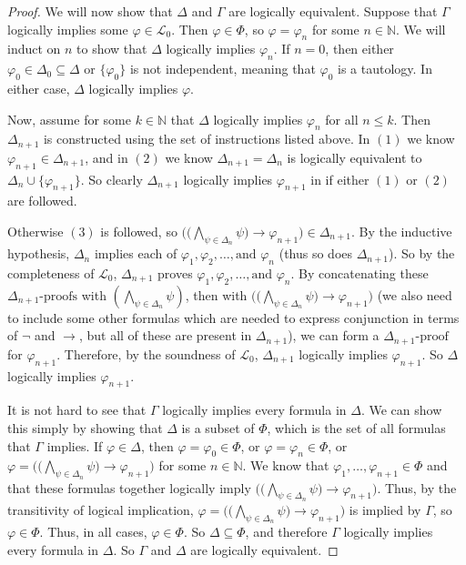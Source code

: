 \documentclass[12pt]{article}
\newcommand{\N}{\mathbb{N}}
\begin{document}
\begin{proof}
We will now show that $\Delta$ and $\Gamma$ are logically equivalent.  Suppose that $\Gamma$ logically implies some $\varphi \in \mathcal{L}_0$.  Then $\varphi \in \Phi$, so $\varphi = \varphi_n$ for some $n \in \N$.  We will induct on $n$ to show that $\Delta$ logically implies $\varphi_n$.  If $n = 0$, then either $\varphi_0 \in \Delta_0 \subseteq \Delta$ or $\{ \varphi_0 \}$ is not independent, meaning that $\varphi_0$ is a tautology.  In either case, $\Delta$ logically implies $\varphi$.

Now, assume for some $k \in \N$ that $\Delta$ logically implies $\varphi_n$ for all $n \leq k$.  Then $\Delta_{n+1}$ is constructed using the set of instructions listed above.  In $(1)$ we know $\varphi_{n+1} \in \Delta_{n+1}$, and in $(2)$ we know $\Delta_{n+1} = \Delta_n$ is logically equivalent to $\Delta_n \cup \{ \varphi_{n+1} \}$.  So clearly $\Delta_{n+1}$ logically implies $\varphi_{n+1}$ in if either $(1)$ or $(2)$ are followed.

Otherwise $(3)$ is followed, so $\big( \big( \bigwedge_{\psi \in \Delta_n} \psi \big) \to \varphi_{n+1} \big) \in \Delta_{n+1}$.  By the inductive hypothesis, $\Delta_n$ implies each of $\varphi_1, \varphi_2, \dots , \textrm{and } \varphi_n$ (thus so does $\Delta_{n+1}$).  So by the completeness of $\mathcal{L}_0$, $\Delta_{n+1}$ proves $\varphi_1, \varphi_2, \dots , \textrm{and } \varphi_n$.  By concatenating these $\Delta_{n+1} \textrm{-proofs}$ with $\left( \bigwedge_{\psi \in \Delta_n} \psi \right)$, then with $\big( \big( \bigwedge_{\psi \in \Delta_n} \psi \big) \to \varphi_{n+1} \big)$ (we also need to include some other formulas which are needed to express conjunction in terms of $\neg$ and $\to$, but all of these are present in $\Delta_{n+1}$), we can form a $\Delta_{n+1} \textrm{-proof}$ for $\varphi_{n+1}$.  Therefore, by the soundness of $\mathcal{L}_0$, $\Delta_{n+1}$ logically implies $\varphi_{n+1}$.  So $\Delta$ logically implies $\varphi_{n+1}$.

It is not hard to see that $\Gamma$ logically implies every formula in $\Delta$.  We can show this simply by showing that $\Delta$ is a subset of $\Phi$, which is the set of all formulas that $\Gamma$ implies.  If $\varphi \in \Delta$, then $\varphi = \varphi_0 \in \Phi$, or $\varphi = \varphi_n \in \Phi$, or $\varphi = \big( \big( \bigwedge_{\psi \in \Delta_n} \psi \big) \to \varphi_{n+1} \big)$ for some $n \in \N$.  We know that $\varphi_1, \dots, \varphi_{n+1} \in \Phi$ and that these formulas together logically imply $\big( \big( \bigwedge_{\psi \in \Delta_n} \psi \big) \to \varphi_{n+1} \big)$.  Thus, by the transitivity of logical implication, $\varphi = \big( \big( \bigwedge_{\psi \in \Delta_n} \psi \big) \to \varphi_{n+1} \big)$ is implied by $\Gamma$, so $\varphi \in \Phi$.  Thus, in all cases, $\varphi \in \Phi$.  So $\Delta \subseteq \Phi$, and therefore $\Gamma$ logically implies every formula in $\Delta$.  So $\Gamma$ and $\Delta$ are logically equivalent.


\end{proof}
\end{document}

